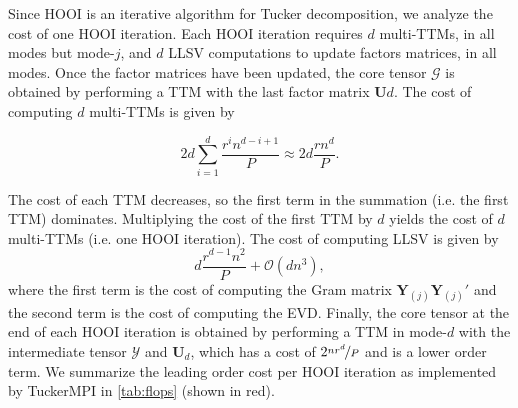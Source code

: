         Since HOOI is an iterative algorithm for Tucker decomposition, we analyze the
        cost of one HOOI iteration. Each HOOI iteration requires $d$ multi-TTMs, in all
        modes but mode-$j$, and $d$ LLSV computations to update factors matrices, in all
        modes. Once the factor matrices have been updated, the core tensor $\mathcal{G}$ is
        obtained by performing a TTM with the last factor matrix $\mathbf{U}{d}$. The cost
        of computing $d$ multi-TTMs is given by

        \begin{equation*}
            2d \sum_{i=1}^{d} \frac{r^i n^{d-i+1}}{P} \approx 2d\frac{rn^d}{P}.
        \end{equation*}

        The cost of each TTM decreases, so the first term in the summation (i.e. the
        first TTM) dominates. Multiplying the cost of the first TTM by $d$ yields the
        cost of $d$ multi-TTMs (i.e. one HOOI iteration). The cost of computing LLSV is
        given by
        \begin{equation*}
            d\frac{r^{d-1}n^2}{P} + \mathcal{O}(dn^3),
        \end{equation*}
        where the first term is the cost of computing the Gram matrix
        $\mathbf{Y}_{(j)}\mathbf{Y}_{(j)}'$ and the second term is the cost of
        computing the EVD. Finally, the core tensor at the end of each HOOI
        iteration is obtained by performing a TTM in mode-$d$ with the
        intermediate tensor $\mathcal{Y}$ and $\mathbf{U}_{d}$, which has a cost of
        $2\nicefrac{nr^{d}}{P}$ and is a lower order term. We summarize the
        leading order cost per HOOI iteration as implemented by TuckerMPI in
        \cref{tab:flops} (shown in red).


